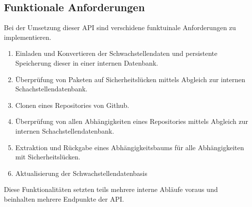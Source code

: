 \subsection{Funktionale Anforderungen} \label{sec:Funktionale_Anforderungen}
    Bei der Umsetzung dieser API sind verschidene funktuinale Anforderungen zu implementieren.
    \begin{enumerate}
        \item Einladen und Konvertieren der Schwachstellendaten und persistente Speicherung dieser in einer internen Datenbank.
        \item Überprüfung von Paketen auf Sicherheitslücken mittels Abgleich zur internen Schachstellendatenbank.
        \item Clonen eines Repositories von Github.
        \item Überprüfung von allen Abhängigkeiten eines Repositories mittels Abgleich zur internen Schachstellendatenbank.
        \item Extraktion und Rückgabe eines Abhängigkeitsbaums für alle Abhängigkeiten mit Sicherheitslücken. 
        \item Aktualisierung der Schwachstellendatenbasis
    \end{enumerate}
    Diese Funktionalitäten setzten teils mehrere interne Abläufe voraus und beinhalten mehrere Endpunkte der API.
